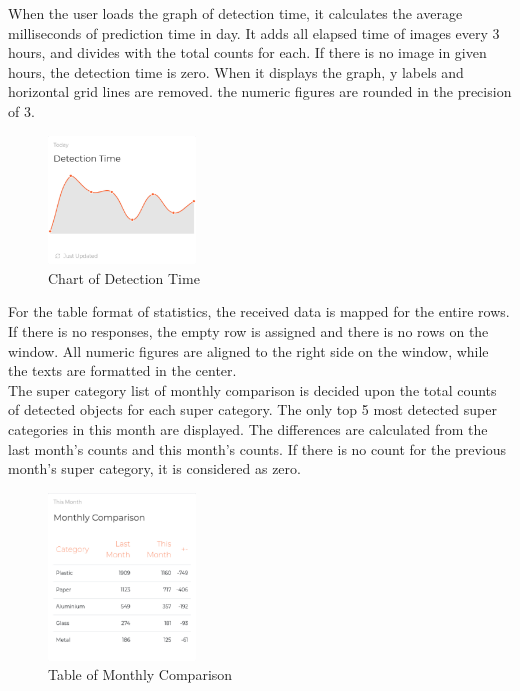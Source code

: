 \documentclass[conference]{IEEEtran}
\begin{document}
When the user loads the graph of detection time, it calculates the average milliseconds of prediction time in day. It adds all elapsed time of images every 3 hours, and divides with the total counts for each. If there is no image in given hours, the detection time is zero. When it displays the graph, y labels and horizontal grid lines are removed. the numeric figures are rounded in the precision of 3.\\

\begin{figure}[h]
    \centering
    \includegraphics[width=0.35\textwidth]{images/dashboard_time_chart.eps}
    \caption{Chart of Detection Time}
\end{figure}

For the table format of statistics, the received data is mapped for the entire rows. If there is no responses, the empty row is assigned and there is no rows on the window. All numeric figures are aligned to the right side on the window, while the texts are formatted in the center.\\

The super category list of monthly comparison is decided upon the total counts of detected objects for each super category. The only top 5 most detected super categories in this month are displayed. The differences are calculated from the last month's counts and this month's counts. If there is no count for the previous month's super category, it is considered as zero.\\

\begin{figure}[h]
    \centering
    \includegraphics[width=0.35\textwidth]{images/dashboard_comp_table.eps}
    \caption{Table of Monthly Comparison}
\end{figure}
\end{document}
